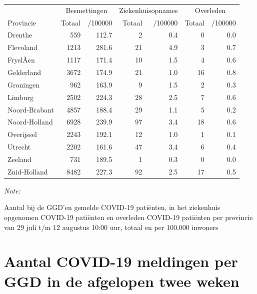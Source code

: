 \documentclass[
  english,
  man,floatsintext]{apa6}
\begin{document}
\begin{table}
\centering
\begin{threeparttable}
\begin{tabular}{lrrrrrr}
\toprule
\multicolumn{1}{c}{ } & \multicolumn{2}{c}{Besmettingen} & \multicolumn{2}{c}{Ziekenhuisopnames} & \multicolumn{2}{c}{Overleden} \\
\cmidrule(l{3pt}r{3pt}){2-3} \cmidrule(l{3pt}r{3pt}){4-5} \cmidrule(l{3pt}r{3pt}){6-7}
Provincie & Totaal & /100000 & Totaal & /100000 & Totaal & /100000\\
\midrule
Drenthe & 559 & 112.7 & 2 & 0.4 & 0 & 0.0\\
Flevoland & 1213 & 281.6 & 21 & 4.9 & 3 & 0.7\\
FryslÃ¢n & 1117 & 171.4 & 10 & 1.5 & 4 & 0.6\\
Gelderland & 3672 & 174.9 & 21 & 1.0 & 16 & 0.8\\
Groningen & 962 & 163.9 & 9 & 1.5 & 2 & 0.3\\
Limburg & 2502 & 224.3 & 28 & 2.5 & 7 & 0.6\\
Noord-Brabant & 4857 & 188.4 & 29 & 1.1 & 5 & 0.2\\
Noord-Holland & 6928 & 239.9 & 97 & 3.4 & 18 & 0.6\\
Overijssel & 2243 & 192.1 & 12 & 1.0 & 1 & 0.1\\
Utrecht & 2202 & 161.6 & 47 & 3.4 & 6 & 0.4\\
Zeeland & 731 & 189.5 & 1 & 0.3 & 0 & 0.0\\
Zuid-Holland & 8482 & 227.3 & 92 & 2.5 & 17 & 0.5\\
\bottomrule
\end{tabular}
\begin{tablenotes}
\item \textit{Note: } 
\item Aantal bij de GGD’en gemelde COVID-19 patiënten, in het ziekenhuis opgenomen COVID-19 patiënten en overleden COVID-19 patiënten per provincie van 29 juli t/m 12 augustus 10:00 uur, totaal en per 100.000 inwoners
\end{tablenotes}
\end{threeparttable}
\end{table}

\newpage

\hypertarget{aantal-covid-19-meldingen-per-ggd-in-de-afgelopen-twee-weken}{%
\section{Aantal COVID-19 meldingen per GGD in de afgelopen twee weken}\label{aantal-covid-19-meldingen-per-ggd-in-de-afgelopen-twee-weken}}
\end{document}
